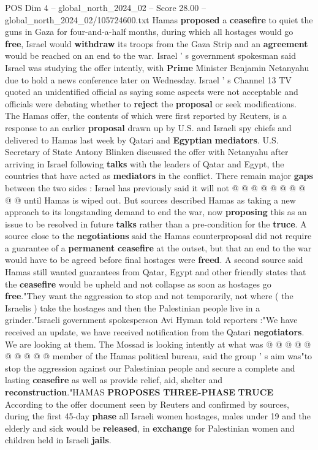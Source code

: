 \begin{textsample}{POS Dim 4 – global\_north\_2024\_02 – Score 28.00 – global\_north\_2024\_02/105724600.txt}  \label{ex:f4_pos_182}
Hamas \textbf{proposed} a \textbf{ceasefire} to quiet the guns in Gaza for four-and-a-half months, during which all hostages would go \textbf{free}, Israel would \textbf{withdraw} its troops from the Gaza Strip and an \textbf{agreement} would be reached on an end to the war.
Israel ' s government spokesman said Israel was studying the offer intently, with \textbf{Prime} Minister Benjamin Netanyahu due to hold a news conference later on Wednesday.
Israel ' s Channel 13 TV quoted an unidentified official as saying some aspects were not acceptable and officials were debating whether to \textbf{reject} the \textbf{proposal} or seek modifications.
The Hamas offer, the contents of which were first reported by Reuters, is a response to an earlier \textbf{proposal} drawn up by U.S. and Israeli spy chiefs and delivered to Hamas last week by Qatari and \textbf{Egyptian} \textbf{mediators}.
U.S.
Secretary of State Antony Blinken discussed the offer with Netanyahu after arriving in Israel following \textbf{talks} with the leaders of Qatar and Egypt, the countries that have acted as \textbf{mediators} in the conflict.
There remain major \textbf{gaps} between the two sides : Israel has previously said it will not @ @ @ @ @ @ @ @ @ @ until Hamas is wiped out.
But sources described Hamas as taking a new approach to its longstanding demand to end the war, now \textbf{proposing} this as an issue to be resolved in future \textbf{talks} rather than a pre-condition for the \textbf{truce}.
A source close to the \textbf{negotiations} said the Hamas counterproposal did not require a guarantee of a \textbf{permanent} \textbf{ceasefire} at the outset, but that an end to the war would have to be agreed before final hostages were \textbf{freed}.
A second source said Hamas still wanted guarantees from Qatar, Egypt and other friendly states that the \textbf{ceasefire} would be upheld and not collapse as soon as hostages go \textbf{free}."They want the aggression to stop and not temporarily, not where ( the Israelis ) take the hostages and then the Palestinian people live in a grinder."Israeli government spokesperson Avi Hyman told reporters :"We have received an update, we have received notification from the Qatari \textbf{negotiators}.
We are looking at them.
The Mossad is looking intently at what was @ @ @ @ @ @ @ @ @ @ member of the Hamas political bureau, said the group ' s aim was"to stop the aggression against our Palestinian people and secure a complete and lasting \textbf{ceasefire} as well as provide relief, aid, shelter and \textbf{reconstruction}."HAMAS \textbf{PROPOSES} \textbf{THREE-PHASE} \textbf{TRUCE} According to the offer document seen by Reuters and confirmed by sources, during the first 45-day \textbf{phase} all Israeli women hostages, males under 19 and the elderly and sick would be \textbf{released}, in \textbf{exchange} for Palestinian women and children held in Israeli \textbf{jails}.

\end{textsample}
